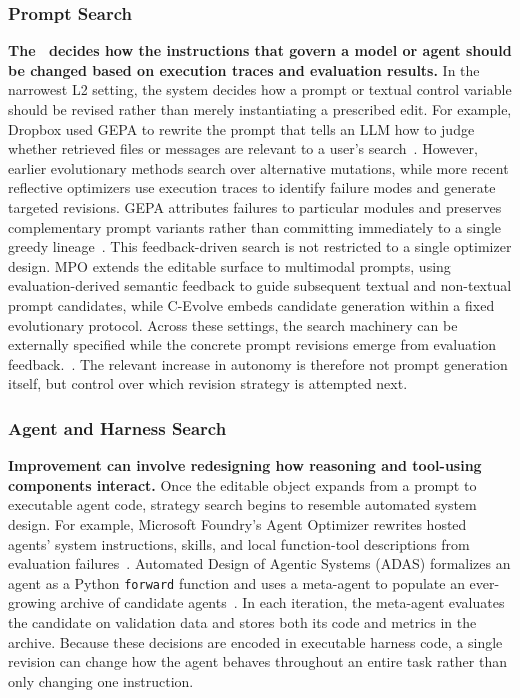 \subsubsection{Prompt Search}
\noindent\textbf{The \Improver \ decides how the instructions that govern a model or agent should be changed based on execution traces and evaluation results.} In the narrowest L2 setting, the system decides how a prompt or textual control variable should be revised rather than merely instantiating a prescribed edit. For example, Dropbox used GEPA to rewrite the prompt that tells an LLM how to judge whether retrieved files or messages are relevant to a user's search~\cite{dropbox2026dspy}.
However, earlier evolutionary methods search over alternative mutations, while more recent reflective optimizers use execution traces to identify failure modes and generate targeted revisions. GEPA attributes failures to particular modules and preserves complementary prompt variants rather than committing immediately to a single greedy lineage~\cite{agrawal2026gepa}. This feedback-driven search is not restricted to a single optimizer design. MPO extends the editable surface to multimodal prompts, using evaluation-derived semantic feedback to guide subsequent textual and non-textual prompt candidates, while C-Evolve embeds candidate generation within a fixed evolutionary protocol. Across these settings, the search machinery can be externally specified while the concrete prompt revisions emerge from evaluation feedback.~\cite{choi2026mpo,li2026cevolve}.
The relevant increase in autonomy is therefore not prompt generation itself, but control over which revision strategy is attempted next.


\subsubsection{Agent and Harness Search}
\noindent\textbf{Improvement can involve redesigning how reasoning and tool-using components interact.} Once the editable object expands from a prompt to executable agent code, strategy search begins to resemble automated system design.  %
For example, Microsoft Foundry's Agent Optimizer rewrites hosted agents' system instructions, skills, and local function-tool descriptions from evaluation failures~\cite{microsoft2026agentoptimizer}.
Automated Design of Agentic Systems (ADAS) formalizes an agent as a Python \texttt{forward} function and uses a meta-agent to populate an ever-growing archive of candidate agents~\cite{hu2025adas}. In each iteration, the meta-agent evaluates the candidate on validation data and stores both its code and metrics in the archive.
Because these decisions are encoded in executable harness code, a single revision can change how the agent behaves throughout an entire task rather than only changing one instruction.


